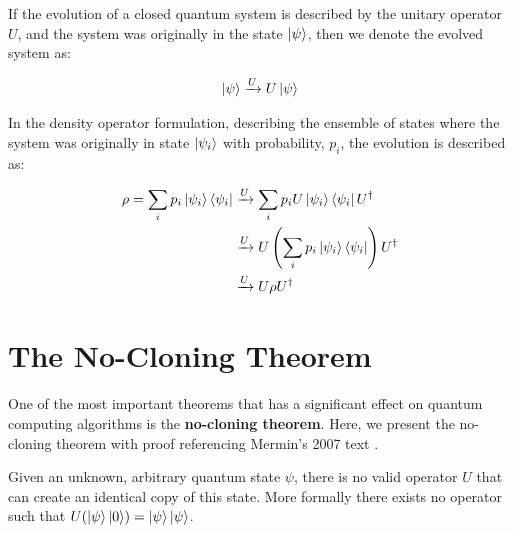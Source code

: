 If the evolution of a closed quantum system is described by the unitary operator $U$, and the system was originally in the state $\ket{\psi}$, then we denote the evolved system as:

\begin{align}
    \ket{\psi} \xrightarrow{U} U \ket{\psi}
\end{align}

In the density operator formulation, describing the ensemble of states where the system was originally in state $\ket{\psi_i}$ with probability, $p_i$, the evolution is described as:

\begin{align}
    \rho = \sum_i p_i \ket{\psi_i}\bra{\psi_i} &\xrightarrow{U} \sum_i p_i U\ket{\psi_i}\bra{\psi_i}U^{\dagger} \\
    &\xrightarrow{U} U \left(\sum_i p_i \ket{\psi_i}\bra{\psi_i} \right)U^{\dagger} \\
    &\xrightarrow{U} U \rho U^{\dagger}
\end{align}

\section{The No-Cloning Theorem}

One of the most important theorems that has a significant effect on quantum computing algorithms is the \textbf{no-cloning theorem}. Here, we present the no-cloning theorem with proof referencing Mermin's 2007 text \cite{mermin_quantum_2007}.

\begin{noclonetheorem}{}
    \label{thm:no-cloning-thm}
    Given an unknown, arbitrary quantum state $\psi$, there is no valid operator $U$ that can create an identical copy of this state. More formally there exists no operator such that $U(\ket{\psi} \ket{0}) = \ket{\psi}\ket{\psi}$.
\end{noclonetheorem}


